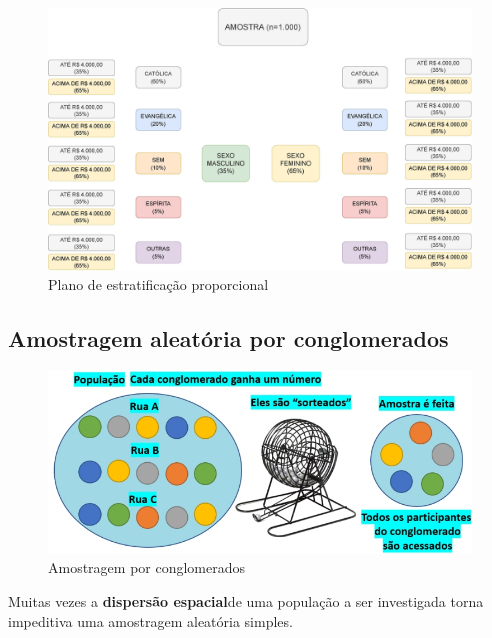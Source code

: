 \documentclass[
]{book}
\begin{document}
\hfill\break

\begin{figure}

{\centering \includegraphics[width=0.8\linewidth]{images7/estratificada} 

}

\caption{Plano de estratificação proporcional}\label{fig:fig06}
\end{figure}

\hfill\break

\hypertarget{amostragem-aleatuxf3ria-por-conglomerados}{%
\subsection{Amostragem aleatória por conglomerados}\label{amostragem-aleatuxf3ria-por-conglomerados}}

\hfill\break

\begin{figure}

{\centering \includegraphics[width=0.8\linewidth]{images7/conglomerado} 

}

\caption{Amostragem por conglomerados}\label{fig:fig07}
\end{figure}

\hfill\break

Muitas vezes a \textbf{dispersão espacial}de uma população a ser investigada torna impeditiva uma amostragem aleatória simples.
\end{document}
